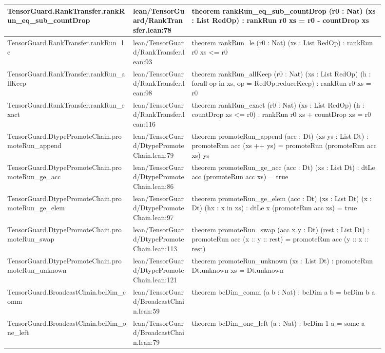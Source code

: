 \documentclass[10pt]{article}
\begin{document}
\begin{longtable}{|p{0.30\linewidth}|p{0.14\linewidth}|p{0.46\linewidth}|}
\hline
TensorGuard.RankTransfer.rankRun\_eq\_sub\_countDrop & lean/TensorGuard/RankTransfer.lean:78 & theorem rankRun\_eq\_sub\_countDrop (r0 : Nat) (xs : List RedOp) : rankRun r0 xs = r0 - countDrop xs \\
\hline
TensorGuard.RankTransfer.rankRun\_le & lean/TensorGuard/RankTransfer.lean:93 & theorem rankRun\_le (r0 : Nat) (xs : List RedOp) : rankRun r0 xs <= r0 \\
\hline
TensorGuard.RankTransfer.rankRun\_allKeep & lean/TensorGuard/RankTransfer.lean:98 & theorem rankRun\_allKeep (r0 : Nat) (xs : List RedOp) (h : forall op in xs, op = RedOp.reduceKeep) : rankRun r0 xs = r0 \\
\hline
TensorGuard.RankTransfer.rankRun\_exact & lean/TensorGuard/RankTransfer.lean:116 & theorem rankRun\_exact (r0 : Nat) (xs : List RedOp) (h : countDrop xs <= r0) : rankRun r0 xs + countDrop xs = r0 \\
\hline
TensorGuard.DtypePromoteChain.promoteRun\_append & lean/TensorGuard/DtypePromoteChain.lean:79 & theorem promoteRun\_append (acc : Dt) (xs ys : List Dt) : promoteRun acc (xs ++ ys) = promoteRun (promoteRun acc xs) ys \\
\hline
TensorGuard.DtypePromoteChain.promoteRun\_ge\_acc & lean/TensorGuard/DtypePromoteChain.lean:86 & theorem promoteRun\_ge\_acc (acc : Dt) (xs : List Dt) : dtLe acc (promoteRun acc xs) = true \\
\hline
TensorGuard.DtypePromoteChain.promoteRun\_ge\_elem & lean/TensorGuard/DtypePromoteChain.lean:97 & theorem promoteRun\_ge\_elem (acc : Dt) (xs : List Dt) (x : Dt) (hx : x in xs) : dtLe x (promoteRun acc xs) = true \\
\hline
TensorGuard.DtypePromoteChain.promoteRun\_swap & lean/TensorGuard/DtypePromoteChain.lean:113 & theorem promoteRun\_swap (acc x y : Dt) (rest : List Dt) : promoteRun acc (x :: y :: rest) = promoteRun acc (y :: x :: rest) \\
\hline
TensorGuard.DtypePromoteChain.promoteRun\_unknown & lean/TensorGuard/DtypePromoteChain.lean:121 & theorem promoteRun\_unknown (xs : List Dt) : promoteRun Dt.unknown xs = Dt.unknown \\
\hline
TensorGuard.BroadcastChain.bcDim\_comm & lean/TensorGuard/BroadcastChain.lean:59 & theorem bcDim\_comm (a b : Nat) : bcDim a b = bcDim b a \\
\hline
TensorGuard.BroadcastChain.bcDim\_one\_left & lean/TensorGuard/BroadcastChain.lean:79 & theorem bcDim\_one\_left (a : Nat) : bcDim 1 a = some a \\
\hline

\end{longtable}
\end{document}
